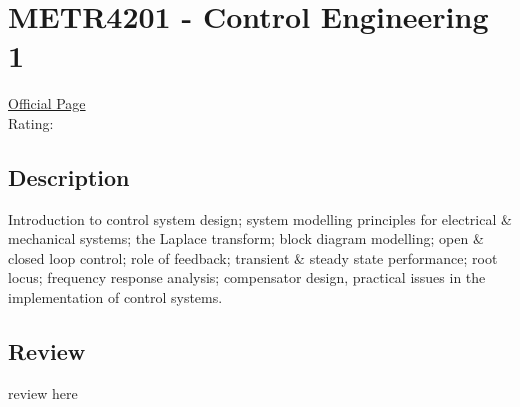 \hypertarget{METR4201}{\section{METR4201 - Control Engineering 1}}

\large
\textcolor{turbo_purple}{\href{https://my.uq.edu.au/programs-courses/course.html?course_code=METR4201}{Official Page}} \\
Rating: \cstar\cstar\cstar\cstar\ostar

\normalsize
\subsection*{Description}
Introduction to control system design; system modelling principles for electrical \& mechanical systems; the Laplace transform; block diagram modelling; open \& closed loop control; role of feedback; transient \& steady state performance; root locus; frequency response analysis; compensator design, practical issues in the implementation of control systems.

\subsection*{Review}
review here
